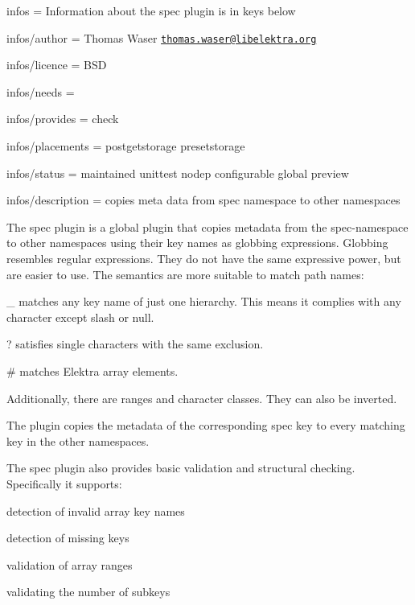 
\begin{DoxyItemize}
\item infos = Information about the spec plugin is in keys below
\item infos/author = Thomas Waser \href{mailto:thomas.waser@libelektra.org}{\tt thomas.\+waser@libelektra.\+org}
\item infos/licence = B\+S\+D
\item infos/needs =
\item infos/provides = check
\item infos/placements = postgetstorage presetstorage
\item infos/status = maintained unittest nodep configurable global preview
\item infos/description = copies meta data from spec namespace to other namespaces
\end{DoxyItemize}

The spec plugin is a global plugin that copies metadata from the {\ttfamily spec}-\/namespace to other namespaces using their key names as globbing expressions. Globbing resembles regular expressions. They do not have the same expressive power, but are easier to use. The semantics are more suitable to match path names\+:


\begin{DoxyItemize}
\item \+\_\+ matches any key name of just one hierarchy. This means it complies with any character except slash or null.
\item ? satisfies single characters with the same exclusion.
\item \# matches Elektra array elements.
\item Additionally, there are ranges and character classes. They can also be inverted.
\end{DoxyItemize}

The plugin copies the metadata of the corresponding {\ttfamily spec} key to every matching key in the other namespaces.

The spec plugin also provides basic validation and structural checking. Specifically it supports\+:


\begin{DoxyItemize}
\item detection of invalid array key names
\item detection of missing keys
\item validation of array ranges
\item validating the number of subkeys
\end{DoxyItemize}

